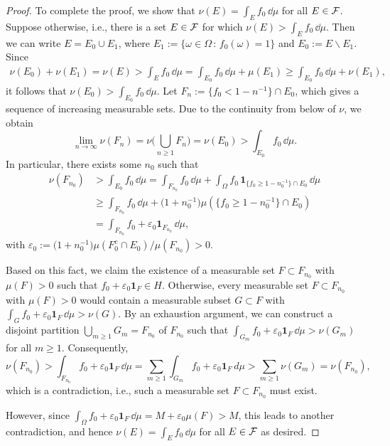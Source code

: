 \begin{proof}
	To complete the proof, we show that $\nu(E)=\int_E f_0\,\dd\mu$ for all $E\in\mathcal F$. Suppose otherwise, i.e., there is a set $E\in\mathcal F$ for which $\nu(E)>\int_E f_0\,\dd\mu$. Then we can write $E=E_0\cup E_1$, where $E_1:= \{ \omega\in\Omega\,:\, f_0(\omega)=1\}$ and $E_0:= E\backslash E_1$. Since
	\begin{align*}
		\nu(E_0) + \nu(E_1) = \nu(E) > \int_E f_0\,\dd\mu = \int_{E_0} f_0\,\dd\mu + \mu(E_1) \ge \int_{E_0} f_0\,\dd\mu + \nu(E_1),
	\end{align*}
	it follows that $\nu(E_0)>\int_{E_0} f_0\,\dd\mu$. Let $F_n:= \{f_0<1-n^{-1}\}\cap E_0$, which gives a sequence of increasing measurable sets. Due to the continuity from below of $\nu$, we obtain
	\[
		\lim_{n\to\infty}\nu(F_n) = \nu\Biggl(\bigcup_{n\ge 1} F_n\Biggr) = \nu(E_0)>\int_{E_0} f_0\,\dd\mu.
	\]
	In particular, there exists some $n_0$ such that
	\begin{align*}
		\nu(F_{n_0}) &> \int_{E_0} f_0\,\dd\mu = \int_{F_{n_0}}f_0\,\dd\mu + \int_\Omega f_0\,\mathbf{1}_{\{f_0\ge 1-n_0^{-1}\}\cap E_0}\,\dd\mu \\
		&\ge \int_{F_{n_0}}f_0\, \dd\mu + \bigl(1 + n_0^{-1}\bigr)\mu(\{f_0\ge 1-n_0^{-1}\}\cap E_0) \\
		&= \int_{F_{n_0}}f_0 + \varepsilon_0\mathbf{1}_{F_{n_0}}\, \dd\mu,
	\end{align*}
	with $\varepsilon_0 := \bigl(1 + n_0^{-1}\bigr)\mu(F_0^c\cap E_0)/\mu(F_{n_0}) >0$. 
	
	Based on this fact, we claim the existence of a measurable set $F\subset F_{n_0}$ with $\mu(F)>0$ such that $f_0 + \varepsilon_0\mathbf{1}_F\in H$. Otherwise, every measurable set $F\subset F_{n_0}$ with $\mu(F)>0$ would contain a measurable subset $G\subset F$ with $\int_G f_0 + \varepsilon_0 \mathbf{1}_F\,\dd\mu > \nu(G)$. By an exhaustion argument, we can construct a disjoint partition $\bigcup_{m\ge 1} G_m = F_{n_0}$ of $F_{n_0}$ such that $\int_{G_m} f_0 + \varepsilon_0 \mathbf{1}_F\,\dd\mu > \nu(G_m)$ for all $m\ge 1$. Consequently,
\[
	\nu(F_{n_0}) > \int_{F_{n_0}}f_0 + \varepsilon_0\mathbf{1}_{F}\, \dd\mu = \sum_{m\ge 1} \int_{G_m} f_0 + \varepsilon_0 \mathbf{1}_F\,d\mu > \sum_{m\ge 1} \nu(G_m) = \nu(F_{n_0}),
\]
which is a contradiction, i.e., such a measurable set $F\subset F_{n_0}$ must exist. 

However, since $\int_\Omega f_0 + \varepsilon_0\mathbf{1}_F\,\dd\mu = M + \varepsilon_0\mu(F) > M$, this leads to another contradiction, and hence $\nu(E)=\int_E f_0\,\dd\mu$ for all $E\in\mathcal F$ as desired.
\end{proof}


